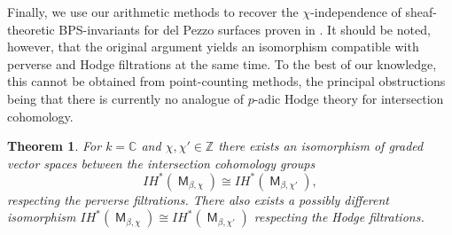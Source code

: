 \documentclass{article}
\DeclareMathOperator{\M}{{\mathsf{M}}}
\newcommand{\BC}{{\mathbb{C}}}
\newcommand{\BZ}{{\mathbb{Z}}}
\theoremstyle{definition}
\theoremstyle{plain}
\newtheorem{theorem}[definition]{Theorem}
\begin{document}
Finally, we use our arithmetic methods to recover the $\chi$-independence of sheaf-theoretic BPS-invariants for del Pezzo surfaces proven in \cite{MS20}. It should be noted, however, that the original argument yields an isomorphism compatible with perverse and Hodge filtrations at the same time. To the best of our knowledge, this cannot be obtained from point-counting methods, the principal obstructions being that there is currently no analogue of $p$-adic Hodge theory for intersection cohomology.









\begin{theorem}\cite[Theorem 0.1]{MS20}\label{mscor} For $k= \BC$ and $\chi,\chi' \in \BZ$ there exists an isomorphism of graded vector spaces between the intersection cohomology groups
\[ IH^*(\M_{\beta,\chi}) \cong IH^*(\M_{\beta,\chi'}),  \]
respecting the perverse filtrations. There also exists a possibly different isomorphism $IH^*(\M_{\beta,\chi}) \cong IH^*(\M_{\beta,\chi'})$ respecting the Hodge filtrations. 
\end{theorem}
\end{document}
